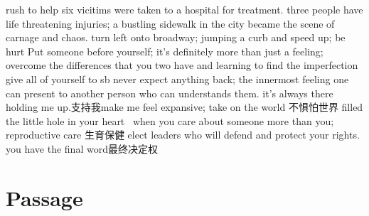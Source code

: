 \documentclass[a4paper,12pt]{article}
\begin{document}
rush to help six vicitims were taken to a hospital for treatment.
three people have life threatening injuries;  a bustling sidewalk in the city became the scene of carnage and chaos.
turn left onto broadway;  jumping a curb and speed up; be hurt
Put someone before yourself; it's definitely more than just a feeling; overcome the differences that you two have and learning to find the imperfection
give all of yourself to sb never expect anything back; the innermost feeling one can present to another person who can understands them.
it's always there holding me up.支持我make me feel expansive;  take on the world 不惧怕世界 filled the little hole in your heart 
when you care about someone more than you;  reproductive care 生育保健
elect leaders who will defend and protect your rights. you have the final word最终决定权


\section{Passage}
\end{document}
